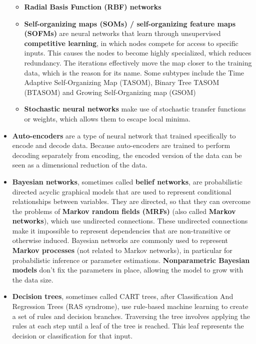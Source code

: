 \begin{itemize}
\begin{itemize}
			\item \textbf{Radial Basis Function (RBF) networks}
				\cite{rbf}
			\item \textbf{Self-organizing maps (SOMs) / self-organizing feature maps (SOFMs)}
				are neural networks that learn through unsupervised \textbf{competitive learning}, in which nodes compete for access to specific inputs. This causes the nodes to become highly specialized, which reduces redundancy. The iterations effectively move the map closer to the training data, which is the reason for its name. Some subtypes include the Time Adaptive Self-Organizing Map (TASOM), Binary Tree TASOM (BTASOM) and Growing Self-Organizing map (GSOM)
			\item \textbf{Stochastic neural networks}
				make use of stochastic transfer functions or weights, which allows them to escape local minima. 
		\end{itemize}
	\item \textbf{Auto-encoders}
		are a type of neural network that trained specifically to encode and decode data. Because auto-encoders are trained to perform decoding separately from encoding, the encoded version of the data can be seen as a dimensional reduction of the data.
	\item \textbf{Bayesian networks}, 
		sometimes called \textbf{belief networks}, are probabilistic directed acyclic graphical models\cite{Wain08}\cite{Kol09}\cite{Xin16} that are used to represent conditional relationships between variables. They are directed, so that they can overcome the problems of \textbf{Markov random
		fields (MRFs)} (also called \textbf{Markov networks}), which use undirected connections. These undirected connections make it impossible to represent dependencies that are non-transitive or otherwise induced. Bayesian networks are commonly used to represent \textbf{Markov processes} (not related to Markov networks), in particular for probabilistic inference or parameter estimations.
		\textbf{Nonparametric Bayesian models}\cite{Grif05}\cite{Teh06} don't fix the parameters in place, allowing the model to grow with the data size.
	\item \textbf{Decision trees},
		sometimes called CART trees, after Classification And Regression Trees (RAS syndrome), use rule-based machine learning to create a set of rules and decision branches. Traversing the tree involves applying the rules at each step until a leaf of the tree is reached. This leaf represents the decision or classification for that input.

\end{itemize}

